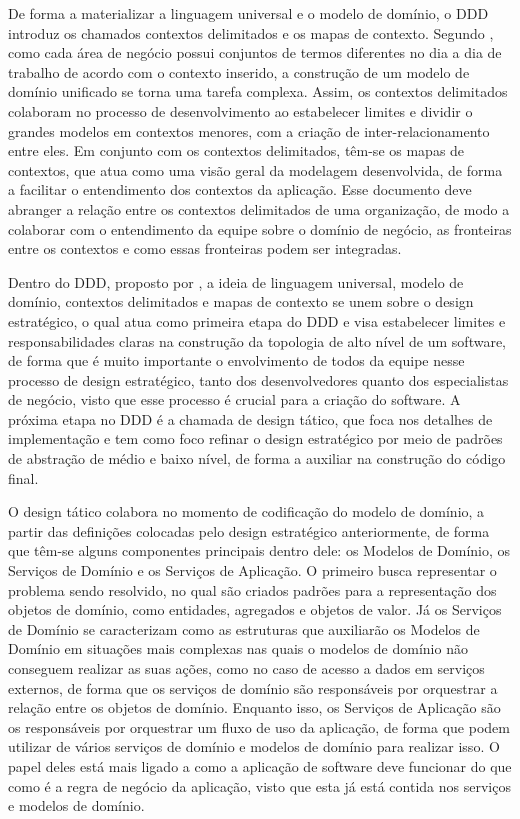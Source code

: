 \documentclass[12pt, %
openright, 
oneside, %
a4paper,    %
brazil]{facom-ufu-abntex2}
\begin{document}
De forma a materializar a linguagem universal e o modelo de domínio, o DDD introduz os chamados contextos delimitados e os mapas de contexto. Segundo , como cada área de negócio possui conjuntos de termos diferentes no dia a dia de trabalho de acordo com o contexto inserido, a construção de um modelo de domínio unificado se torna uma tarefa complexa. Assim, os contextos delimitados colaboram no processo de desenvolvimento ao estabelecer limites e dividir o grandes modelos em contextos menores, com a criação de inter-relacionamento entre eles. Em conjunto com os contextos delimitados, têm-se os mapas de contextos, que atua como uma visão geral da modelagem desenvolvida, de forma a facilitar o entendimento dos contextos da aplicação. Esse documento deve abranger a relação entre os contextos delimitados de uma organização, de modo a colaborar com o entendimento da equipe sobre o domínio de negócio, as fronteiras entre os contextos e como essas fronteiras podem ser integradas.

Dentro do DDD, proposto por , a ideia de linguagem universal, modelo de domínio, contextos delimitados e mapas de contexto se unem sobre o design estratégico, o qual atua como primeira etapa do DDD e visa estabelecer limites e responsabilidades claras na construção da topologia de alto nível de um software, de forma que é muito importante o envolvimento de todos da equipe nesse processo de design estratégico, tanto dos desenvolvedores quanto dos especialistas de negócio, visto que esse processo é crucial para a criação do software. A próxima etapa no DDD é a chamada de design tático, que foca nos detalhes de implementação e tem como foco refinar o design estratégico por meio de padrões de abstração de médio e baixo nível, de forma a auxiliar na construção do código final.

O design tático colabora no momento de codificação do modelo de domínio, a partir das definições colocadas pelo design estratégico anteriormente, de forma que têm-se alguns componentes principais dentro dele: os Modelos de Domínio, os Serviços de Domínio e os Serviços de Aplicação. O primeiro busca representar o problema sendo resolvido, no qual são criados padrões para a representação dos objetos de domínio, como entidades, agregados e objetos de valor. Já os Serviços de Domínio se caracterizam como as estruturas que auxiliarão os Modelos de Domínio em situações mais complexas nas quais o modelos de domínio não conseguem realizar as suas ações, como no caso de acesso a dados em serviços externos, de forma que os serviços de domínio são responsáveis por orquestrar a relação entre os objetos de domínio. Enquanto isso, os Serviços de Aplicação são os responsáveis por orquestrar um fluxo de uso da aplicação, de forma que podem utilizar de vários serviços de domínio e modelos de domínio para realizar isso. O papel deles está mais ligado a como a aplicação de software deve funcionar do que como é a regra de negócio da aplicação, visto que esta já está contida nos serviços e modelos de domínio.
\end{document}
